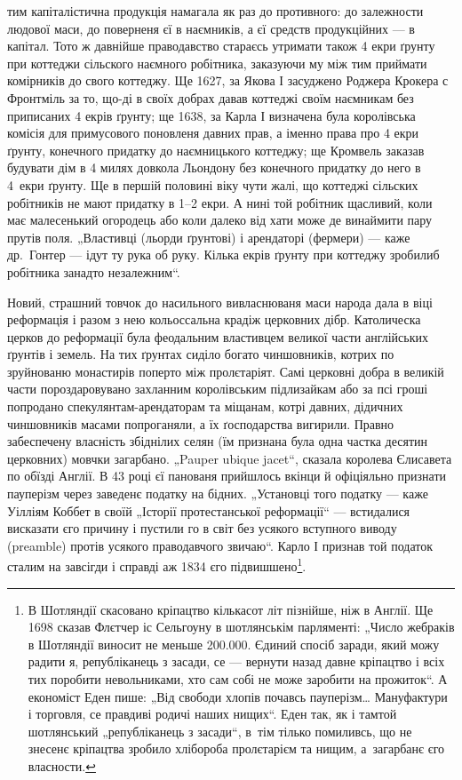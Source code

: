 \parcont{}
тим капіталістична продукція намагала як раз до противного: до залежности людової маси, до поверненя
єї в наємників, а єї средств продукційних — в капітал. Тото ж давнійше праводавство стараєсь утримати
також 4 екри ґрунту при коттеджи сільского наємного робітника, заказуючи му між тим приймати
комірників до свого коттеджу. Ще 1627, за Якова І засуджено Роджера Крокера с Фронтміль за то,
що-ді в своїх добрах давав коттеджі своїм наємникам без приписаних 4 екрів ґрунту; ще 1638, за Карла
І визначена була королівська комісія для примусового поновленя давних прав, а іменно права про 4
екри ґрунту, конечного придатку до наємницького коттеджу; ще Кромвель заказав будувати дім в 4 милях
довкола Льондону без конечного придатку до него в 4~екри ґрунту. Ще в першій половині  віку чути
жалі, що коттеджі сільских робітників не мают придатку в 1--2 екри. А нині той робітник щасливий,
коли має малесенький огородець або коли далеко від хати може де винаймити пару прутів поля.
„Властивці (льорди ґрунтові) і арендаторі (фермери) — каже др.~Гонтер — ідут ту рука об руку. Кілька
екрів ґрунту при коттеджу зробилиб робітника занадто незалежним“.

Новий, страшний товчок до насильного вивласнюваня маси народа дала в  віці реформація і разом з
нею кольоссальна
крадіж церковних дібр. Католическа церков до реформації була феодальним
властивцем великої части англійських ґрунтів і земель. На тих ґрунтах сиділо богато чиншовників,
котрих по зруйнованю монастирів поперто між пролєтаріят. Самі церковні добра в великій части
пороздаровувано захланним королівським підлизайкам або за псі гроші попродано
спекулянтам-арендаторам та міщанам, котрі давних, дідичних чиншовників масами попроганяли, а їх
ґосподарства вигирили. Правно забеспечену власність збіднілих селян (їм признана була одна частка
десятин церковних) мовчки загарбано. „Pauper ubique jacet“, сказала королева Єлисавета по обїзді
Англії. В 43 році єї панованя прийшлось вкінци й офіціяльно признати пауперізм через заведенє
податку на бідних. „Установці того податку
— каже Уілліям Коббет в своїй „Історії протестанської реформації“ — встидалися висказати єго причину
і пустили го в світ без усякого вступного виводу (preamble) протів усякого праводавчого звичаю“.
Карло І признав той податок сталим на завсігди і справді аж 1834 єго підвишшено\footnote{
В Шотляндії скасовано кріпацтво кількасот літ пізнійше, ніж в Англії. Ще 1698 сказав Флєтчер іс
Сельгоуну в шотлянськім парляменті: „Число жебраків в Шотляндії виносит не меньше \num{200.000}. Єдиний 
спосіб заради, який можу радити я, републіканець з засади, се — вернути
назад давне кріпацтво і всіх тих поробити невольниками, хто сам
собі не може заробити на прожиток“. А економіст Еден пише: „Від свободи
хлопів почавсь пауперізм\dots{} Мануфактури і торговля, се правдиві
родичі наших нищих“. Еден так, як і тамтой шотлянський „републіканець
з засади“, в~тім тілько помиливсь, що не знесенє кріпацтва зробило хлібороба
пролєтарієм та нищим, а~загарбанє єго власности.}.
